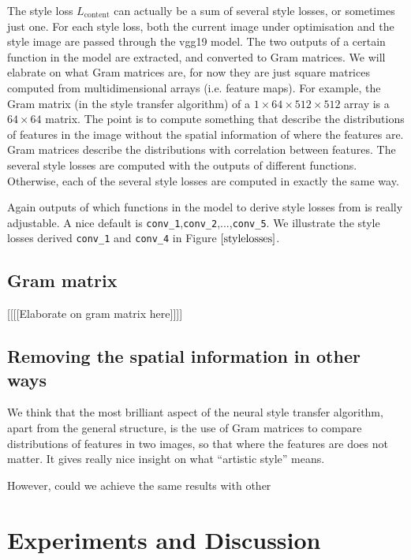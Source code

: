 \documentclass[runningheads]{llncs}
\begin{document}
The style loss $L_\text{content}$ can actually be a sum of several style losses, or sometimes just one.
For each style loss, 
both the current image under optimisation and the style image are passed through the vgg19 model.
The two outputs of a certain function in the model are extracted, 
and converted to Gram matrices. We will elabrate on what Gram matrices are,
for now they are just square matrices computed from multidimensional arrays (i.e. feature maps).
For example, the Gram matrix (in the style transfer algorithm) of a $1\times64\times512\times512$ array
is a $64\times64$ matrix.
The point is to compute something that describe the distributions of features
in the image without the spatial information of where the features are.
Gram matrices describe the distributions with correlation between features.
The several style losses are computed with the outputs of different functions.
Otherwise, each of the several style losses are computed in exactly the same way.

Again outputs of which functions in the model to derive style losses from is really adjustable.
A nice default is \verb|conv_1|,\verb|conv_2|,...,\verb|conv_5|. We illustrate
the style losses derived \verb|conv_1| and \verb|conv_4| in Figure $\ref{stylelosses}$.


\subsection{Gram matrix}
[[[[Elaborate on gram matrix here]]]]

\subsection{Removing the spatial information in other ways}
We think that the most brilliant aspect of the neural style transfer algorithm,
apart from the general structure, is the use of Gram matrices to compare 
distributions of features in two images, so that where the features are does not matter.
It gives really nice insight on what ``artistic style'' means.

However, could we achieve the same results with other 

\section{Experiments and Discussion}
\end{document}
